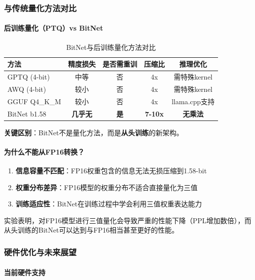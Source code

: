 \documentclass[12pt,a4paper]{article}
\begin{document}
\subsubsection{与传统量化方法对比}

\paragraph{后训练量化（PTQ）vs BitNet}

\begin{table}[H]
\centering
\caption{BitNet与后训练量化方法对比}
\begin{tabular}{lcccc}
\toprule
\textbf{方法} & \textbf{精度损失} & \textbf{是否需重训} & \textbf{压缩比} & \textbf{推理优化} \\
\midrule
GPTQ (4-bit) & 中等 & 否 & 4x & 需特殊kernel \\
AWQ (4-bit) & 较小 & 否 & 4x & 需特殊kernel \\
GGUF Q4\_K\_M & 较小 & 否 & 4x & llama.cpp支持 \\
\midrule
BitNet b1.58 & \textbf{几乎无} & \textbf{是} & \textbf{7-10x} & \textbf{无乘法} \\
\bottomrule
\end{tabular}
\end{table}

\textbf{关键区别}：BitNet不是量化方法，而是\textbf{从头训练}的新架构。

\paragraph{为什么不能从FP16转换？}

\begin{enumerate}
    \item \textbf{信息容量不匹配}：FP16权重包含的信息无法无损压缩到1.58-bit
    \item \textbf{权重分布差异}：FP16模型的权重分布不适合直接量化为三值
    \item \textbf{训练适应性}：BitNet在训练过程中学会利用三值权重表达能力
\end{enumerate}

实验表明，对FP16模型进行三值量化会导致严重的性能下降（PPL增加数倍），而从头训练的BitNet可以达到与FP16相当甚至更好的性能。

\subsubsection{硬件优化与未来展望}

\paragraph{当前硬件支持}
\end{document}
